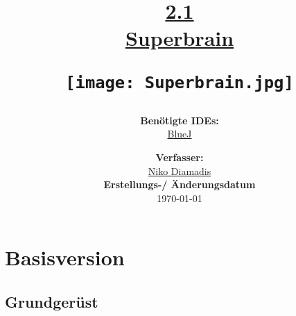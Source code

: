 \documentclass{scrartcl}   %
\begin{document}
\title{\huge{\href{https://www.inf-schule.de/programmierung/oopjava/implementierung/superbrain}{2.1\\Superbrain}}\\
\vspace{0.5cm}
\begin{figure}[ht]
	\centering
	\texttt{[image: Superbrain.jpg]}
\end{figure}
\vspace{2cm}}

\author{\textbf{Benötigte IDEs:}\\
\href{https://www.bluej.org/}{BlueJ}
\vspace{2cm}}

\date{\textbf{Verfasser:}\\
\href{https://nikothegreek.jimdofree.com/}{Niko Diamadis}\\
\vspace{0.5cm}
\textbf{Erstellungs-/ Änderungsdatum}\\
\today\enlargethispage{4cm}}

\doublespacing

\maketitle\thispagestyle{empty}

\cleardoublepage

\setcounter{page}{1}
\tableofcontents


\newpage
{}  %

\cleardoublepage

\section{Basisversion}

\subsection{Grundgerüst}
\end{document}
